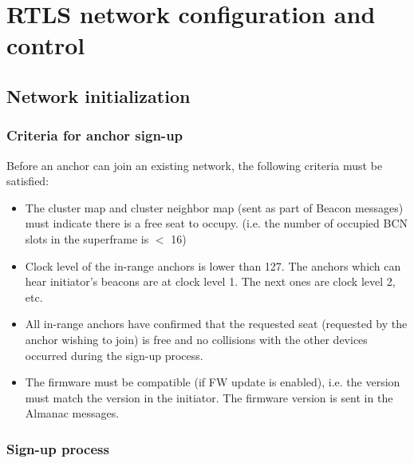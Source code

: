 \documentclass[../main.tex]{subfiles}
\begin{document}
\chapter{RTLS network configuration and control}

\section{Network initialization}
\subsection{Criteria for anchor sign-up}
Before an anchor can join an existing network, the following criteria must be satisfied:
\begin{itemize}
    \item The cluster map and cluster neighbor map (sent as part of Beacon messages) must indicate there is a free seat to occupy. (i.e. the number of occupied BCN slots in the superframe is $<$ 16)
    \item Clock level of the in-range anchors is lower than 127. The anchors which can hear initiator’s beacons are at clock level 1. The next ones are clock level 2, etc.
    \item All in-range anchors have confirmed that the requested seat (requested by the anchor wishing to join) is free and no collisions with the other devices occurred during the sign-up process.
    \item The firmware must be compatible (if FW update is enabled), i.e. the version must match the version in the initiator. The firmware version is sent in the Almanac messages.
\end{itemize}
\subsection{Sign-up process}
\end{document}
